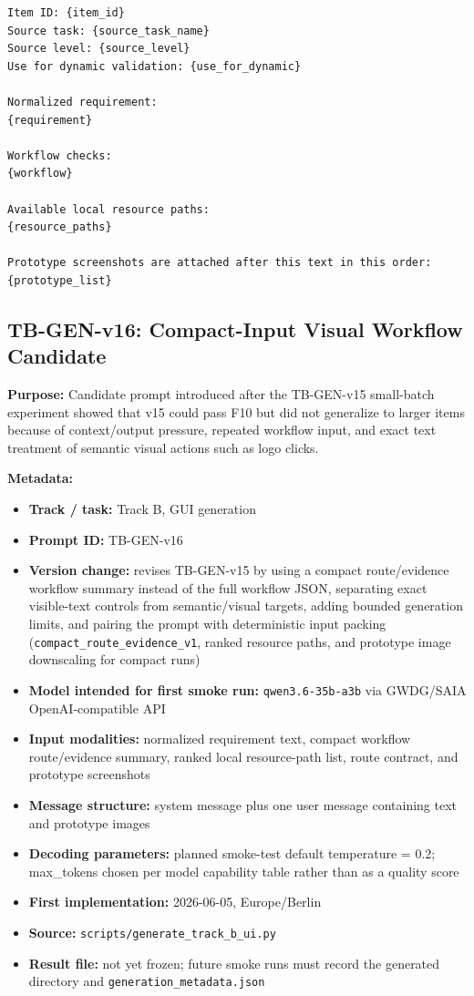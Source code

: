 \begin{verbatim}
Item ID: {item_id}
Source task: {source_task_name}
Source level: {source_level}
Use for dynamic validation: {use_for_dynamic}

Normalized requirement:
{requirement}

Workflow checks:
{workflow}

Available local resource paths:
{resource_paths}

Prototype screenshots are attached after this text in this order:
{prototype_list}
\end{verbatim}
\endgroup

\subsection{TB-GEN-v16: Compact-Input Visual Workflow Candidate}
\label{app:prompt-tb-gen-v16}

\textbf{Purpose:} Candidate prompt introduced after the TB-GEN-v15 small-batch
experiment showed that v15 could pass F10 but did not generalize to larger
items because of context/output pressure, repeated workflow input, and exact
text treatment of semantic visual actions such as logo clicks.

\textbf{Metadata:}
\begin{itemize}
  \item \textbf{Track / task:} Track B, GUI generation
  \item \textbf{Prompt ID:} TB-GEN-v16
  \item \textbf{Version change:} revises TB-GEN-v15 by using a compact
  route/evidence workflow summary instead of the full workflow JSON, separating
  exact visible-text controls from semantic/visual targets, adding bounded
  generation limits, and pairing the prompt with deterministic input packing
  (\texttt{compact\_route\_evidence\_v1}, ranked resource paths, and prototype
  image downscaling for compact runs)
  \item \textbf{Model intended for first smoke run:} \texttt{qwen3.6-35b-a3b}
  via GWDG/SAIA OpenAI-compatible API
  \item \textbf{Input modalities:} normalized requirement text, compact
  workflow route/evidence summary, ranked local resource-path list, route
  contract, and prototype screenshots
  \item \textbf{Message structure:} system message plus one user message
  containing text and prototype images
  \item \textbf{Decoding parameters:} planned smoke-test default temperature =
  0.2; max\_tokens chosen per model capability table rather than as a quality
  score
  \item \textbf{First implementation:} 2026-06-05, Europe/Berlin
  \item \textbf{Source:} \texttt{scripts/generate\_track\_b\_ui.py}
  \item \textbf{Result file:} not yet frozen; future smoke runs must record the
  generated directory and \texttt{generation\_metadata.json}
\end{itemize}

